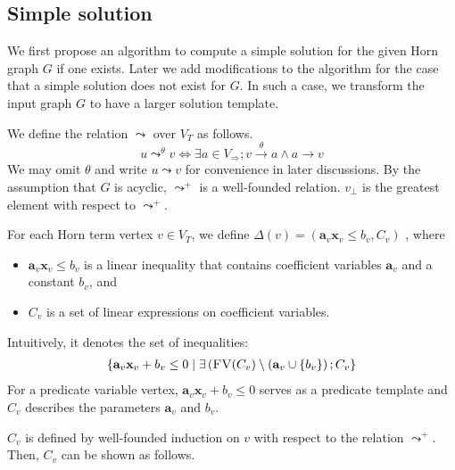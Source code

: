 \documentclass[a4paper,12pt]{article}
\newcommand{\edge}[2]{#1\rightarrow#2}
\newcommand{\edgel}[3]{#1\xrightarrow{#2}#3}
\begin{document}
\subsection{Simple solution}

We first propose an algorithm to compute a simple solution for the
given Horn graph $G$ if one exists.  Later we add modifications to the
algorithm for the case that a simple solution does not exist for $G$.
In such a case, we transform the input graph $G$ to have a larger
solution template.

We define the relation $\leadsto$ over $V_T$ as follows.
\[ u \mathop{\leadsto}^\theta v \Longleftrightarrow
\exists a \in V_\Rightarrow; \edgel{v}{\theta}{a} \wedge \edge{a}{v} \]
We may omit $\theta$ and write $u \leadsto v$ for convenience in later
discussions. By the assumption that $G$ is acyclic, $\leadsto^+$ is a
well-founded relation. $v_\bot$ is the greatest element with respect
to $\leadsto^+$.

For each Horn term vertex $v \in V_T$, we define
$\Delta(v) = (\mathbf{a}_v \mathbf{x}_v \leq b_v, C_v)$
, where
\begin{itemize}
\item $\mathbf{a}_v \mathbf{x}_v \leq b_v$ is a linear inequality that
  contains coefficient variables $\mathbf{a}_v$ and a constant $b_v$,
  and
\item $C_v$ is a set of linear expressions on coefficient variables.
\end{itemize}
Intuitively, it denotes the set of inequalities:
\begin{align*}
\left\lbrace
 \mathbf{a}_v \mathbf{x}_v + b_v \leq 0 \mid
 \exists \left( \textsc{FV}(C_v)
  \setminus (\mathbf{a}_v \cup \left\lbrace b_v \right\rbrace
 \right); C_v
\right\rbrace
\end{align*}
For a predicate variable vertex, $\mathbf{a}_v \mathbf{x}_v + b_v \leq
0$ serves as a predicate template and $C_v$ describes the parameters
$\mathbf{a}_v$ and $b_v$.

$C_v$ is defined by well-founded induction on $v$ with respect to the
relation $\leadsto^+$. Then, $C_v$ can be shown as follows.
\end{document}
